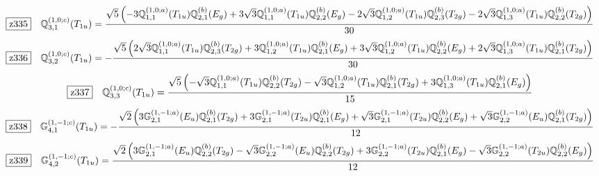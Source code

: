 \documentclass[fleqn,10pt,landscape]{jsarticle}
\begin{document}
\begin{dmath*}
\hspace*{3mm}\fbox{z335}\quad \mathbb{Q}_{3,1}^{(1,0;c)}(T_{1u})=\frac{\sqrt{5} \left(- 3 \mathbb{Q}_{1,1}^{(1,0;a)}(T_{1u}) \mathbb{Q}_{2,1}^{(b)}(E_{g}) + 3 \sqrt{3} \mathbb{Q}_{1,1}^{(1,0;a)}(T_{1u}) \mathbb{Q}_{2,2}^{(b)}(E_{g}) - 2 \sqrt{3} \mathbb{Q}_{1,2}^{(1,0;a)}(T_{1u}) \mathbb{Q}_{2,3}^{(b)}(T_{2g}) - 2 \sqrt{3} \mathbb{Q}_{1,3}^{(1,0;a)}(T_{1u}) \mathbb{Q}_{2,2}^{(b)}(T_{2g})\right)}{30}
\end{dmath*}
\begin{dmath*}
\hspace*{3mm}\fbox{z336}\quad \mathbb{Q}_{3,2}^{(1,0;c)}(T_{1u})=- \frac{\sqrt{5} \left(2 \sqrt{3} \mathbb{Q}_{1,1}^{(1,0;a)}(T_{1u}) \mathbb{Q}_{2,3}^{(b)}(T_{2g}) + 3 \mathbb{Q}_{1,2}^{(1,0;a)}(T_{1u}) \mathbb{Q}_{2,1}^{(b)}(E_{g}) + 3 \sqrt{3} \mathbb{Q}_{1,2}^{(1,0;a)}(T_{1u}) \mathbb{Q}_{2,2}^{(b)}(E_{g}) + 2 \sqrt{3} \mathbb{Q}_{1,3}^{(1,0;a)}(T_{1u}) \mathbb{Q}_{2,1}^{(b)}(T_{2g})\right)}{30}
\end{dmath*}
\begin{dmath*}
\hspace*{3mm}\fbox{z337}\quad \mathbb{Q}_{3,3}^{(1,0;c)}(T_{1u})=\frac{\sqrt{5} \left(- \sqrt{3} \mathbb{Q}_{1,1}^{(1,0;a)}(T_{1u}) \mathbb{Q}_{2,2}^{(b)}(T_{2g}) - \sqrt{3} \mathbb{Q}_{1,2}^{(1,0;a)}(T_{1u}) \mathbb{Q}_{2,1}^{(b)}(T_{2g}) + 3 \mathbb{Q}_{1,3}^{(1,0;a)}(T_{1u}) \mathbb{Q}_{2,1}^{(b)}(E_{g})\right)}{15}
\end{dmath*}
\begin{dmath*}
\hspace*{3mm}\fbox{z338}\quad \mathbb{G}_{4,1}^{(1,-1;c)}(T_{1u})=- \frac{\sqrt{2} \left(3 \mathbb{G}_{2,1}^{(1,-1;a)}(E_{u}) \mathbb{Q}_{2,1}^{(b)}(T_{2g}) + 3 \mathbb{G}_{2,1}^{(1,-1;a)}(T_{2u}) \mathbb{Q}_{2,1}^{(b)}(E_{g}) + \sqrt{3} \mathbb{G}_{2,1}^{(1,-1;a)}(T_{2u}) \mathbb{Q}_{2,2}^{(b)}(E_{g}) + \sqrt{3} \mathbb{G}_{2,2}^{(1,-1;a)}(E_{u}) \mathbb{Q}_{2,1}^{(b)}(T_{2g})\right)}{12}
\end{dmath*}
\begin{dmath*}
\hspace*{3mm}\fbox{z339}\quad \mathbb{G}_{4,2}^{(1,-1;c)}(T_{1u})=\frac{\sqrt{2} \left(3 \mathbb{G}_{2,1}^{(1,-1;a)}(E_{u}) \mathbb{Q}_{2,2}^{(b)}(T_{2g}) - \sqrt{3} \mathbb{G}_{2,2}^{(1,-1;a)}(E_{u}) \mathbb{Q}_{2,2}^{(b)}(T_{2g}) + 3 \mathbb{G}_{2,2}^{(1,-1;a)}(T_{2u}) \mathbb{Q}_{2,1}^{(b)}(E_{g}) - \sqrt{3} \mathbb{G}_{2,2}^{(1,-1;a)}(T_{2u}) \mathbb{Q}_{2,2}^{(b)}(E_{g})\right)}{12}
\end{dmath*}
\end{document}
